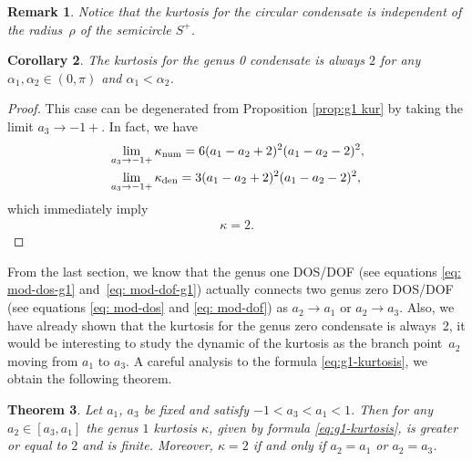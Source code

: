 \documentclass[10pt,a4paper]{amsart}
\numberwithin{equation}{section}
\newtheorem{Theorem}{Theorem}[section]
\newtheorem{Corollary}[Theorem]{Corollary}
\newtheorem{Remark}[Theorem]{Remark}
\def\ra{\rightarrow}
\begin{document}
\begin{Remark}
Notice that the kurtosis for the circular condensate is independent of the radius~$\rho$ of the semicircle $S^+$.
\end{Remark}

\begin{Corollary}\label{thm: g0 kur}
The kurtosis for the genus 0 condensate is always $2$ for any $\alpha_1,\alpha_2\in (0,\pi)$ and $\alpha_1<\alpha_2$.
\end{Corollary}

\begin{proof}
This case can be degenerated from Proposition \ref{prop:g1 kur} by taking the limit $a_3\ra-1+$. In fact, we have
\begin{align*}
&\lim_{a_3\ra-1+}\kappa_{\rm num}=6 (a_{1}-a_{2}+2 )^{2} (a_{1}-a_{2}-2 )^{2},\\
&\lim_{a_3\ra-1+}\kappa_{\rm den}=3 (a_{1}-a_{2}+2 )^{2} (a_{1}-a_{2}-2 )^{2},
\end{align*}
which immediately imply
\begin{align*}
\kappa = 2.
\tag*{\qed}
\end{align*}
\renewcommand{\qed}{}
\end{proof}


From the last section, we know that the genus one DOS/DOF (see equations \eqref{eq: mod-dos-g1} and~\eqref{eq: mod-dof-g1}) actually connects two genus zero DOS/DOF (see equations \eqref{eq: mod-dos} and \eqref{eq: mod-dof}) as $a_2\ra a_1$ or $a_2\ra a_3$. Also, we have already shown that the kurtosis for the genus zero condensate is always~2, it would be interesting to study the dynamic of the kurtosis as the branch point~$a_2$ moving from $a_1$ to $a_3$. A careful analysis to the formula \eqref{eq:g1-kurtosis}, we obtain the following theorem.

\begin{Theorem}\label{Thm:g1 kappa ineq}
Let $a_1$, $a_3$ be fixed and satisfy $-1<a_3<a_1<1$. Then for any $a_2\in [a_3,a_1]$ the genus $1$ kurtosis $\kappa$, given by formula \eqref{eq:g1-kurtosis}, is greater or equal to $2$ and is finite. Moreover, $\kappa=2$ if and only if $a_2=a_1$ or $a_2=a_3$.






\end{Theorem}
\end{document}

